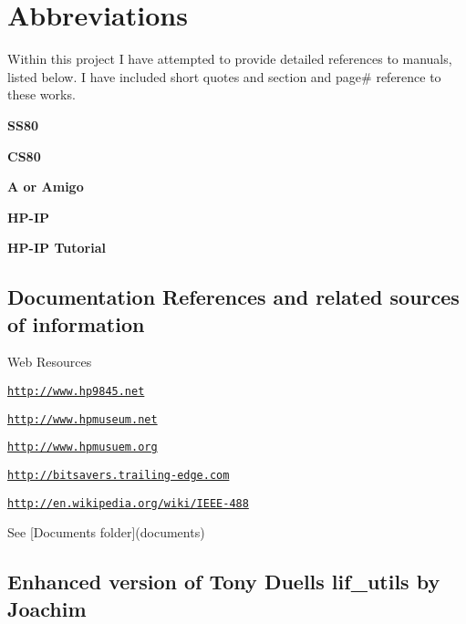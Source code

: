 \section*{Abbreviations}

Within this project I have attempted to provide detailed references to manuals, listed below. I have included short quotes and section and page\# reference to these works.
\begin{DoxyItemize}
\item {\bfseries S\+S80}
\item {\bfseries C\+S80}
\item {\bfseries A or Amigo}
\item {\bfseries H\+P-\/\+IP}
\item {\bfseries H\+P-\/\+IP Tutorial}
\end{DoxyItemize}



 \subsection*{Documentation References and related sources of information}


\begin{DoxyItemize}
\item Web Resources
\begin{DoxyItemize}
\item \href{http://www.hp9845.net}{\tt http\+://www.\+hp9845.\+net}
\item \href{http://www.hpmuseum.net}{\tt http\+://www.\+hpmuseum.\+net}
\item \href{http://www.hpmusuem.org}{\tt http\+://www.\+hpmusuem.\+org}
\item \href{http://bitsavers.trailing-edge.com}{\tt http\+://bitsavers.\+trailing-\/edge.\+com}
\item \href{http://en.wikipedia.org/wiki/IEEE-488}{\tt http\+://en.\+wikipedia.\+org/wiki/\+I\+E\+E\+E-\/488}
\item See \mbox{[}Documents folder\mbox{]}(documents)
\end{DoxyItemize}
\end{DoxyItemize}



 \subsection*{Enhanced version of Tony Duell\textquotesingle{}s lif\+\_\+utils by Joachim}


